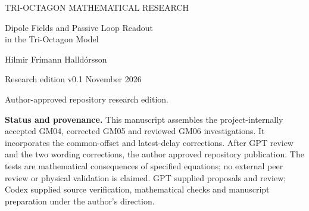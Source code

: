 \documentclass[11pt,a4paper]{article}
\numberwithin{equation}{section}
\theoremstyle{remark}\newtheorem{remark}[theorem]{Remark}
\begin{document}
\begin{titlepage}
{\small\color{ink} TRI-OCTAGON MATHEMATICAL RESEARCH\par}
\vspace{10mm}
{\LARGE\bfseries\raggedright Dipole Fields and Passive Loop Readout\\[2mm]
in the Tri-Octagon Model\par}
\vspace{8mm}
{\large Hilmir Frímann Halldórsson\par}
\vspace{3mm}
{Research edition v0.1  November 2026\par}
{\small Author-approved repository research edition.\par}
\vspace{8mm}
\begin{abstract}
A steady tangent-encoded circulation on an adopted Tri-Octagon carrier circle produces a vector observation whose spatial curl has the dipole angular tensor and inverse-cube leading decay. We develop two signed tests from that exterior kernel. In the coaxial test the vector observation vanishes at the receiving circle's center, yet its oriented rim integral has the source sign at every positive pair of radii and nonzero axial separation. Rotational symmetry makes one ideal tangential rim sample sufficient in this special case.

The native map does not itself assign the required carrier means. A proposed three-loop source impulse lifts the native planar observable \(W\) to unique minimum-storage means under equal weights. Its exact Fourier launch costs \(6.768750025\times10^{-9}L\alpha^2\); conjugation reverses the means at the same cost. A finite receiving circle on a registered rigid copy distinguishes the two launches for every \(R\ge100w\), with a relative error certificate below one third. At \(R=100w\), 1,024 additional exact contour samples also suffice. The circle center, body-center probe, finite-area component, source offsets and complete delay window remain distinct. The source impulse and contour readout are explicit additions. An internal source donor and a law changing a second native triad remain open.
\end{abstract}
\vfill
{\small\textbf{Status and provenance.} This manuscript assembles the project-internally accepted GM04, corrected GM05 and reviewed GM06 investigations. It incorporates the common-offset and latest-delay corrections. After GPT review and the two wording corrections, the author approved repository publication. The tests are mathematical consequences of specified equations; no external peer review or physical validation is claimed. GPT supplied proposals and review; Codex supplied source verification, mathematical checks and manuscript preparation under the author's direction.}
\end{titlepage}
\setcounter{page}{2}





\appendix


\end{document}
